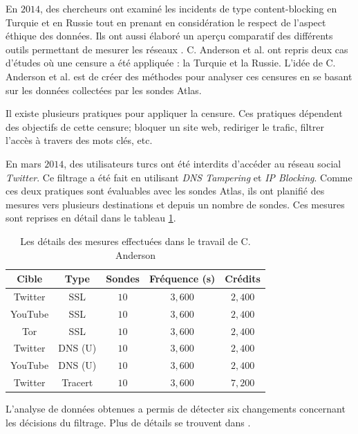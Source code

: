 En $2014$, des chercheurs ont examiné les incidents de type content-blocking en Turquie et en  Russie tout en prenant en considération le respect de l'aspect éthique des données. Ils ont aussi élaboré  un aperçu comparatif des différents outils permettant de mesurer les réseaux \cite{Collin-Anderson}. C. Anderson et al. ont repris deux cas d'études où une censure a été appliquée : la Turquie et la Russie. L'idée de C. Anderson et al. est de créer des méthodes pour analyser ces censures en se basant sur les données collectées par les sondes   Atlas. \par

Il existe plusieurs pratiques pour appliquer la censure. Ces pratiques dépendent des objectifs de cette censure; bloquer un site web, rediriger le trafic, filtrer l'accès à travers des mots clés, etc.

En mars $2014$, des utilisateurs turcs ont été interdits d'accéder au réseau social  \textit{Twitter}.  Ce filtrage a été fait en utilisant \textit{DNS Tampering} et \textit{IP Blocking}. Comme ces deux pratiques sont évaluables avec les sondes  Atlas, ils ont planifié des mesures vers plusieurs destinations et depuis un nombre de  sondes. Ces mesures sont  reprises en détail dans le tableau  \ref{ta:censorship-colin}.

\begin{table}[H]
	\centering
	\captionsetup{justification=centering}
	\begin{tabular}{ c c c c c}
		\textbf{Cible} &\textbf{Type} &	\textbf{Sondes} &\textbf{Fréquence (s)}	& \textbf{Crédits} \\ \hline
		Twitter &SSL &$ 10 $ &$ 3,600 $ &$ 2,400 $\\ \hline
		YouTube &SSL &$ 10 $ &$ 3,600 $ &$ 2,400 $ \\ \hline
		Tor & SSL &$ 10 $ &$ 3,600 $ &$ 2,400 $ \\ \hline
		Twitter & DNS (U) &$ 10 $ &$ 3,600 $ &$ 2,400 $ \\ \hline
		YouTube & DNS (U) &$ 10 $ &$ 3,600 $ &$ 2,400 $ \\ \hline
		Twitter &Tracert &$ 10 $ &$ 3,600 $ & $ 7,200 $ \\ \hline
	\end{tabular}
	\caption{Les détails des mesures effectuées dans le travail de C. Anderson \cite{Collin-Anderson} }
	\label{ta:censorship-colin}
\end{table}

L'analyse de données obtenues a permis de  détecter  six changements concernant les décisions du filtrage. Plus de détails se trouvent dans \cite{Collin-Anderson}.

